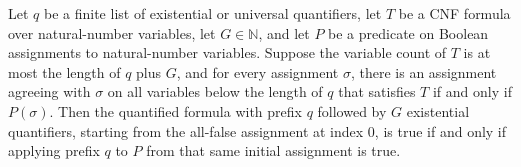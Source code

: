 \begin{theorem}
\label{Complexity.QBF.truth_exSuffix_of_pointwise}
\leanok
{}
Let $q$ be a finite list of existential or universal quantifiers, let $T$ be a CNF
formula over natural-number variables, let $G\in\mathbb{N}$, and let $P$ be a predicate
on Boolean assignments to natural-number variables. Suppose the variable count of $T$ is
at most the length of $q$ plus $G$, and for every assignment $\sigma$, there is an
assignment agreeing with $\sigma$ on all variables below the length of $q$ that
satisfies $T$ if and only if $P(\sigma)$. Then the quantified formula with prefix $q$
followed by $G$ existential quantifiers, starting from the all-false assignment at index
$0$, is true if and only if applying prefix $q$ to $P$ from that same initial assignment
is true.
\end{theorem}
